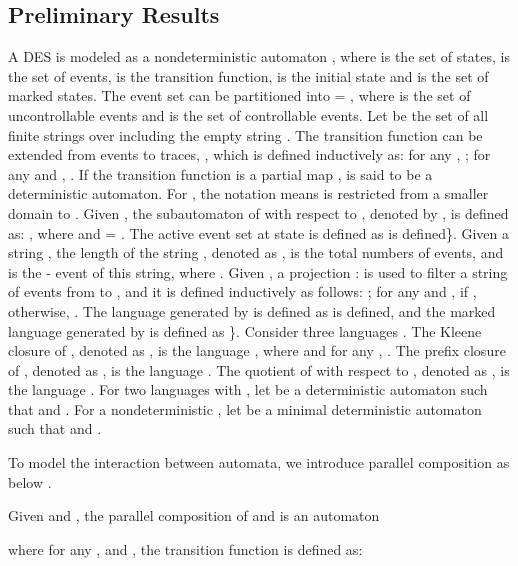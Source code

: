 \documentclass[preprint,authoryear,12pt]{elsarticle}
\begin{document}
\subsection{Preliminary Results}
A DES is modeled as a nondeterministic automaton , where  is the set of states,
 is the set of events,  is the transition function,  is the initial
state and  is the set of marked states. The event
set  can be partitioned into  = , where  is the set of uncontrollable
events and  is the set of controllable events. Let
 be the set of all finite strings over 
including the empty string . The transition function
 can be extended from events to traces, , which is defined
inductively as: for any , ; for
any  and , . If the transition function
is a partial map , 
is said to be a deterministic automaton. For ,
the notation  means  is
restricted from a smaller domain  to
. Given , the subautomaton of  with
respect to , denoted by , is defined as: , where  and  = . The active event set at state  is defined as
 is defined\}.
Given a string , the length of the string ,
denoted as , is the total numbers of events, and  is
the - event of this string, where .
Given , a projection
:  is used to filter a string of events from 
to , and it is defined inductively as follows:
; for any
 and ,
 if , otherwise,
. The language generated by  is defined as
 is defined, and
the marked language generated by  is defined as \}.
Consider three languages . The
Kleene closure of , denoted as , is the language
, where  and
for any , . The prefix closure of ,
denoted as , is the language . The quotient
of  with respect to , denoted as , is the
language . For two languages  with , let  be a
deterministic automaton such that  and
. For a nondeterministic , let
 be a minimal deterministic automaton such that
 and .

To model the interaction between automata, we introduce parallel
composition as below \citep{cassandras2008introduction}.













\begin{Definition}\label{parallel}
Given  and , the parallel composition
of  and  is an automaton

where for any ,  and , the transition function is defined as:


\end{Definition}
\end{document}
